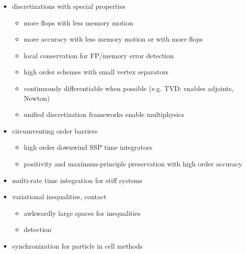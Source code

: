 \documentclass{beamer}
\begin{document}
\begin{frame}
  \begin{itemize}
  \item discretizations with special properties
    \begin{itemize}
    \item more flops with less memory motion
    \item more accuracy with less memory motion or with more flops
    \item local conservation for FP/memory error detection
    \item high order schemes with small vertex separators
    \item continuously differentiable when possible (e.g. TVD; enables adjoints, Newton)
    \item unified discretization frameworks enable multiphysics
    \end{itemize}
  \item circumventing order barriers
    \begin{itemize}
    \item high order downwind SSP time integrators
    \item positivity and maximum-principle preservation with high order accuracy
    \end{itemize}
  \item multi-rate time integration for stiff systems
  \item variational inequalities, contact
    \begin{itemize}
    \item awkwardly large spaces for inequalities
    \item detection
    \end{itemize}
  \item synchronization for particle in cell methods
  \end{itemize}
\end{frame}
\end{document}
